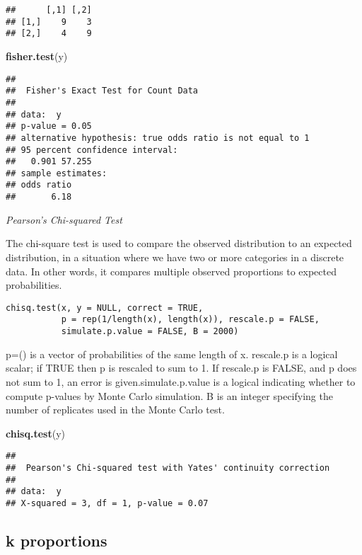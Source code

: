 \documentclass[]{book}
\newenvironment{Shaded}{\begin{snugshade}}{\end{snugshade}}
\newcommand{\KeywordTok}[1]{\textcolor[rgb]{0.13,0.29,0.53}{\textbf{#1}}}
\newcommand{\NormalTok}[1]{#1}
\theoremstyle{definition}
\theoremstyle{definition}
\theoremstyle{definition}
\theoremstyle{remark}
\begin{document}
\begin{verbatim}
##      [,1] [,2]
## [1,]    9    3
## [2,]    4    9
\end{verbatim}

\begin{Shaded}
\begin{Highlighting}[]
\KeywordTok{fisher.test}\NormalTok{(y)}
\end{Highlighting}
\end{Shaded}

\begin{verbatim}
## 
##  Fisher's Exact Test for Count Data
## 
## data:  y
## p-value = 0.05
## alternative hypothesis: true odds ratio is not equal to 1
## 95 percent confidence interval:
##   0.901 57.255
## sample estimates:
## odds ratio 
##       6.18
\end{verbatim}

\emph{Pearson's Chi-squared Test}

The chi-square test is used to compare the observed distribution to an
expected distribution, in a situation where we have two or more
categories in a discrete data. In other words, it compares multiple
observed proportions to expected probabilities.

\begin{verbatim}
chisq.test(x, y = NULL, correct = TRUE,
           p = rep(1/length(x), length(x)), rescale.p = FALSE,
           simulate.p.value = FALSE, B = 2000)
\end{verbatim}

p=() is a vector of probabilities of the same length of x. rescale.p is
a logical scalar; if TRUE then p is rescaled to sum to 1. If rescale.p
is FALSE, and p does not sum to 1, an error is given.simulate.p.value is
a logical indicating whether to compute p-values by Monte Carlo
simulation. B is an integer specifying the number of replicates used in
the Monte Carlo test.

\begin{Shaded}
\begin{Highlighting}[]
\KeywordTok{chisq.test}\NormalTok{(y)}
\end{Highlighting}
\end{Shaded}

\begin{verbatim}
## 
##  Pearson's Chi-squared test with Yates' continuity correction
## 
## data:  y
## X-squared = 3, df = 1, p-value = 0.07
\end{verbatim}

\subsection{k proportions}\label{k-proportions}
\end{document}
